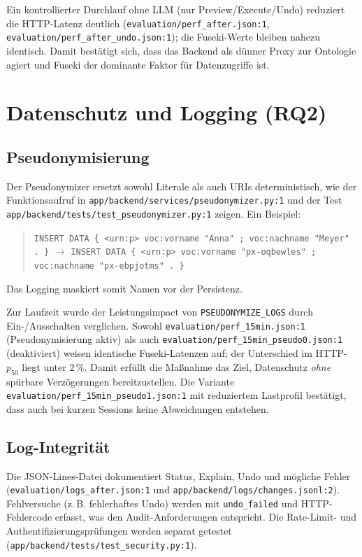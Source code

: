 Ein kontrollierter Durchlauf ohne LLM (nur Preview/Execute/Undo) reduziert die HTTP-Latenz deutlich (\texttt{evaluation/perf\_after.json:1}, \texttt{evaluation/perf\_after\_undo.json:1}); die Fuseki-Werte bleiben nahezu identisch. Damit bestätigt sich, dass das Backend als dünner Proxy zur Ontologie agiert und Fuseki der dominante Faktor für Datenzugriffe ist.

\section{Datenschutz und Logging (RQ2)}

\subsection{Pseudonymisierung}
Der Pseudonymizer ersetzt sowohl Literale als auch URIs deterministisch, wie der Funktionsaufruf in \texttt{app/backend/services/pseudonymizer.py:1} und der Test \texttt{app/backend/tests/test\_pseudonymizer.py:1} zeigen. Ein Beispiel:
\begin{quote}
\texttt{INSERT DATA \{ <urn:p> voc:vorname "Anna" ; voc:nachname "Meyer" . \}} 
\quad$\rightarrow$\quad
\texttt{INSERT DATA \{ <urn:p> voc:vorname "px-oqbewles" ; voc:nachname "px-ebpjotms" . \}}
\end{quote}
Das Logging maskiert somit Namen vor der Persistenz.

Zur Laufzeit wurde der Leistungsimpact von \texttt{PSEUDONYMIZE\_LOGS} durch Ein-/Ausschalten verglichen. Sowohl \texttt{evaluation/perf\_15min.json:1} (Pseudonymisierung aktiv) als auch \texttt{evaluation/perf\_15min\_pseudo0.json:1} (deaktiviert) weisen identische Fuseki-Latenzen auf; der Unterschied im HTTP-$p_{50}$ liegt unter $2\,\%$. Damit erfüllt die Maßnahme das Ziel, Datenschutz \emph{ohne} spürbare Verzögerungen bereitzustellen. Die Variante \texttt{evaluation/perf\_15min\_pseudo1.json:1} mit reduziertem Lastprofil bestätigt, dass auch bei kurzen Sessions keine Abweichungen entstehen.

\subsection{Log-Integrität}
Die JSON-Lines-Datei dokumentiert Status, Explain, Undo und mögliche Fehler (\texttt{evaluation/logs\_after.json:1} und \texttt{app/backend/logs/changes.jsonl:2}). Fehlversuche (z.\,B. fehlerhaftes Undo) werden mit \texttt{undo\_failed} und HTTP-Fehlercode erfasst, was den Audit-Anforderungen entspricht. Die Rate-Limit- und Authentifizierungsprüfungen werden separat getestet (\texttt{app/backend/tests/test\_security.py:1}).

